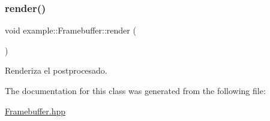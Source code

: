 \subsubsection{\texorpdfstring{render()}{render()}}
{\footnotesize\ttfamily void example\+::\+Framebuffer\+::render (\begin{DoxyParamCaption}{ }\end{DoxyParamCaption})}



Renderiza el postprocesado. 



The documentation for this class was generated from the following file\+:\begin{DoxyCompactItemize}
\item 
\mbox{\hyperlink{_framebuffer_8hpp}{Framebuffer.\+hpp}}\end{DoxyCompactItemize}
